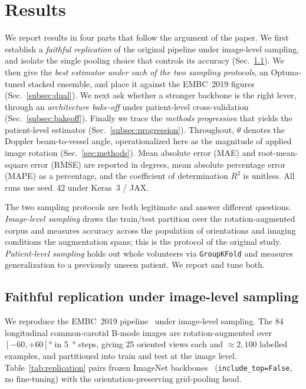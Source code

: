 \section{Results}
\label{sec:results}

We report results in four parts that follow the argument of the paper. We first establish a \emph{faithful replication} of the original pipeline under image-level sampling, and isolate the single pooling choice that controls its accuracy (Sec.~\ref{subsec:replication}). We then give the \emph{best estimator under each of the two sampling protocols}, an Optuna-tuned stacked ensemble, and place it against the EMBC~2019 figures (Sec.~\ref{subsec:dual}). We next ask whether a stronger backbone is the right lever, through an \emph{architecture bake-off} under patient-level cross-validation (Sec.~\ref{subsec:bakeoff}). Finally we trace the \emph{methods progression} that yields the patient-level estimator (Sec.~\ref{subsec:progression}). Throughout, $\theta$ denotes the Doppler beam-to-vessel angle, operationalized here as the magnitude of applied image rotation (Sec.~\ref{sec:methods}). Mean absolute error (MAE) and root-mean-square error (RMSE) are reported in degrees, mean absolute percentage error (MAPE) as a percentage, and the coefficient of determination $R^2$ is unitless. All runs use seed~42 under Keras~3 / JAX.

The two sampling protocols are both legitimate and answer different questions. \emph{Image-level sampling} draws the train/test partition over the rotation-augmented corpus and measures accuracy across the population of orientations and imaging conditions the augmentation spans; this is the protocol of the original study. \emph{Patient-level sampling} holds out whole volunteers via \texttt{GroupKFold} and measures generalization to a previously unseen patient. We report and tune both.

\subsection{Faithful replication under image-level sampling}
\label{subsec:replication}

We reproduce the EMBC~2019 pipeline~\citep{Patil2019} under image-level sampling. The 84 longitudinal common-carotid B-mode images are rotation-augmented over $[-60,+60]\si{\degree}$ in \SI{5}{\degree} steps, giving \num{25} oriented views each and $\approx\!2{,}100$ labelled examples, and partitioned into train and test at the image level. Table~\ref{tab:replication} pairs frozen ImageNet backbones~\citep{Deng2009} (\texttt{include\_top=False}, no fine-tuning) with the orientation-preserving grid-pooling head.

